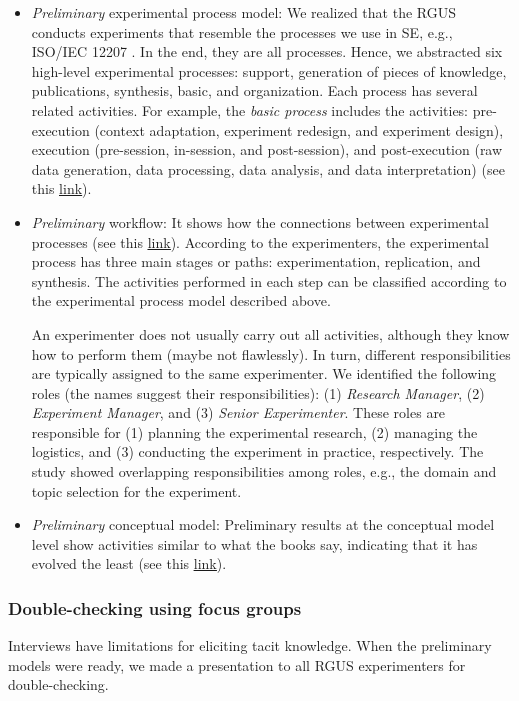 \begin{itemize}
	\item \textit{Preliminary} experimental process model: We realized that the RGUS conducts experiments that resemble the processes we use in SE, e.g., ISO/IEC 12207 \cite{ISO-IEC-IEEE-12207}. In the end, they are all processes. Hence, we abstracted six high-level experimental processes: support, generation of pieces of knowledge, publications, synthesis, basic, and organization. Each process has several related activities. For example, the \textit{basic process} includes the activities: pre-execution (context adaptation, experiment redesign, and experiment design), execution (pre-session, in-session, and post-session), and post-execution (raw data generation, data processing, data analysis, and data interpretation) (see this \href{https://zenodo.org/record/7102301#.Yyt0GOzMLUI}{\ul{link}}).
	
\item \textit{Preliminary} workflow: It shows how the connections between experimental processes (see this \href{https://zenodo.org/record/7102360#.Yyt1a-zMLUI}{\ul{link}}). According to the experimenters, the experimental process has three main stages or paths: experimentation, replication, and synthesis. The activities performed in each step can be classified according to the experimental process model described above.

An experimenter does not usually carry out all activities, although they know how to perform them (maybe not flawlessly). In turn, different responsibilities are typically assigned to the same experimenter. We identified the following roles (the names suggest their responsibilities): (1) \textit{Research Manager}, (2) \textit{Experiment Manager}, and (3) \textit{Senior Experimenter}. These roles are responsible for (1) planning the experimental research, (2) managing the logistics, and (3) conducting the experiment in practice, respectively. The study showed overlapping responsibilities among roles, e.g., the domain and topic selection for the experiment.

	\item \textit{Preliminary} conceptual model: Preliminary results at the conceptual model level show activities similar to what the books say, indicating that it has evolved the least (see this \href{https://zenodo.org/record/7102387#.Yyt7W-zMLUI}{\ul{link}}).
\end{itemize}

\subsubsection{Double-checking using focus groups}\label{subsubsec-focus-groups}
Interviews have limitations for eliciting tacit knowledge. When the preliminary models were ready, we made a presentation to all RGUS experimenters for double-checking. 

